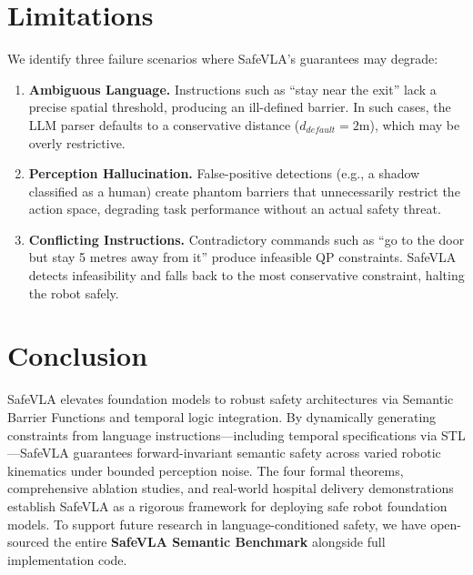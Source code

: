 \documentclass[conference]{IEEEtran}
\begin{document}
\section{Limitations}
We identify three failure scenarios where SafeVLA's guarantees may degrade:

\begin{enumerate}
    \item \textbf{Ambiguous Language.} Instructions such as ``stay near the exit'' lack a precise spatial threshold, producing an ill-defined barrier. In such cases, the LLM parser defaults to a conservative distance ($d_{default} = 2$m), which may be overly restrictive.
    \item \textbf{Perception Hallucination.} False-positive detections (e.g., a shadow classified as a human) create phantom barriers that unnecessarily restrict the action space, degrading task performance without an actual safety threat.
    \item \textbf{Conflicting Instructions.} Contradictory commands such as ``go to the door but stay 5 metres away from it'' produce infeasible QP constraints. SafeVLA detects infeasibility and falls back to the most conservative constraint, halting the robot safely.
\end{enumerate}

\section{Conclusion}
SafeVLA elevates foundation models to robust safety architectures via Semantic Barrier Functions and temporal logic integration. By dynamically generating constraints from language instructions---including temporal specifications via STL---SafeVLA guarantees forward-invariant semantic safety across varied robotic kinematics under bounded perception noise. The four formal theorems, comprehensive ablation studies, and real-world hospital delivery demonstrations establish SafeVLA as a rigorous framework for deploying safe robot foundation models. To support future research in language-conditioned safety, we have open-sourced the entire \textbf{SafeVLA Semantic Benchmark} alongside full implementation code.
\end{document}
